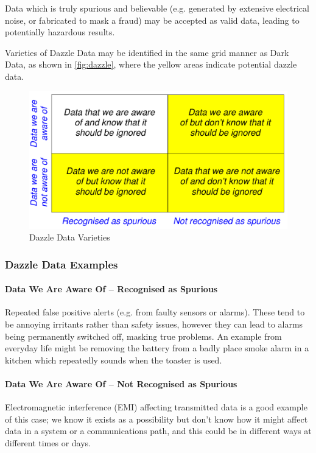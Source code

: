 Data which is truly spurious and believable (e.g. generated by extensive electrical noise, or fabricated to mask a fraud) may be accepted as valid data, leading to potentially hazardous results. 

Varieties of Dazzle Data may be identified in the same grid manner as Dark Data, as shown in \autoref{fig:dazzle}, where the yellow areas indicate potential dazzle data.

\begin{figure}[htbp]
  \centering
  \includegraphics[width=\textwidth/2]{images/dazzleknowns.pdf}
  \caption{Dazzle Data Varieties}
  \label{fig:dazzle}
\end{figure}

\clearpage
\subsubsection{Dazzle Data Examples}

\paragraph{Data We Are Aware Of -- Recognised as Spurious}
Repeated false positive alerts (e.g. from faulty sensors or alarms). These tend to be annoying irritants rather than safety issues, however they can lead to alarms being permanently switched off, masking true problems. An example from everyday life might be removing the battery from a badly place smoke alarm in a kitchen which repeatedly sounds when the toaster is used.

\paragraph{Data We Are Aware Of -- Not Recognised as Spurious}
Electromagnetic interference (EMI) affecting transmitted data is a good example of this case; we know it exists as a possibility but don't know how it might affect data in a system or a communications path, and this could be in different ways at different times or days.

